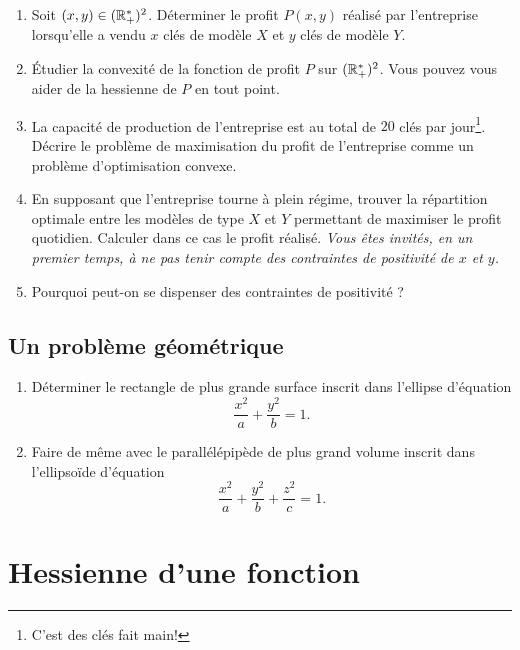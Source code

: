 \documentclass[11pt, a4paper]{article}
\begin{document}
\begin{question}{6}
  \begin{enumerate}
  \item Soit $(x, y) \in (\mathbb{R}_+^*)^2$. Déterminer le profit $P(x, y)$
    réalisé par l’entreprise lorsqu’elle a vendu $x$ clés de modèle $X$
    et $y$ clés de modèle $Y$.
  \item Étudier la convexité de la fonction de profit $P$ sur
    $(\mathbb{R}_+^*)^2$. Vous pouvez vous aider de la hessienne de $P$ en
    tout point.
  \item La capacité de production de l’entreprise est au total de $20$
    clés par jour\footnote{C'est des clés fait main!}. Décrire le
    problème de maximisation du profit de l'entreprise comme un
    problème d'optimisation convexe.
  \item En supposant que l’entreprise tourne à plein régime, trouver
    la répartition optimale entre les modèles de type $X$ et $Y$
    permettant de maximiser le profit quotidien. Calculer dans ce cas
    le profit réalisé. \textit{Vous êtes invités, en un premier temps,
      à ne pas tenir compte des contraintes de positivité de $x$ et
      $y$.}
  \item Pourquoi peut-on se dispenser des contraintes de positivité ?
  \end{enumerate}
\end{question}

\subsection{Un problème géométrique}

\begin{question}
  \begin{enumerate}
  \item
    Déterminer le rectangle de plus grande surface inscrit dans
    l'ellipse d'équation
    \[
    \frac{x^2}{a} + \frac{y^2}{b} = 1.
    \]
  \item
    Faire de même avec le parallélépipède de plus grand volume inscrit
    dans l'ellipsoïde d'équation
    \[
    \frac{x^2}{a} + \frac{y^2}{b} + \frac{z^2}{c} = 1.
    \]
  \end{enumerate}
\end{question}

\section{Hessienne d'une fonction}
\label{sec:hessienne}
\end{document}
